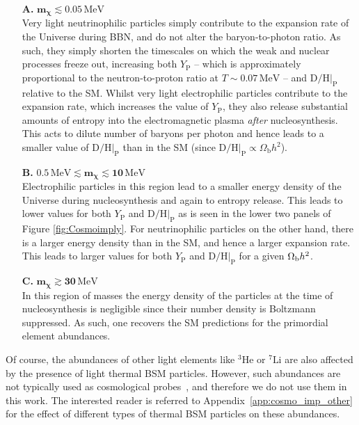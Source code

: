 \begin{enumerate}[leftmargin=0.7cm,itemsep=20pt]
    \item[\textbf{A.}] $\boldsymbol{m_\chi \lesssim 0.05 \, \mathrm{MeV}}$ \\ Very light neutrinophilic particles simply contribute to the expansion rate of the Universe during BBN, and do not alter the baryon-to-photon ratio. As such, they simply shorten the timescales on which the weak and nuclear processes freeze out, increasing both $Y_{\mathrm{P}}$ -- which is approximately proportional to the neutron-to-proton ratio at $T \sim 0.07 \, \mathrm{MeV}$ \cite{Sarkar:1995dd,Iocco:2008va,Pospelov:2010hj} -- and $\mathrm{D}/\mathrm{H}|_{\mathrm{P}}$ relative to the SM. Whilst very light electrophilic particles contribute to the expansion rate, which increases the value of $Y_{\mathrm{P}}$, they also release substantial amounts of entropy into the electromagnetic plasma \emph{after} nucleosynthesis. This acts to dilute number of baryons per photon and hence leads to a smaller value of $\mathrm{D}/\mathrm{H}|_{\mathrm{P}}$ than in the SM (since $\mathrm{D}/\mathrm{H}|_{\mathrm{P}} \propto \Omega_{\mathrm{b}}h^2$).
    
    \item[\textbf{B.}] $\boldsymbol{0.5 \, \mathrm{MeV} \lesssim m_\chi \lesssim 10 \, \mathrm{MeV}}$ \\ Electrophilic particles in this region lead to a smaller energy density of the Universe during nucleosynthesis and again to entropy release. This leads to lower values for both $Y_{\mathrm{P}}$ and $\mathrm{D}/\mathrm{H}|_{\mathrm{P}}$ as is seen in the lower two panels of Figure \ref{fig:Cosmoimply}. For neutrinophilic particles on the other hand, there is a larger energy density than in the SM, and hence a larger expansion rate. This leads to larger values for both $Y_{\mathrm{P}}$ and $\mathrm{D}/\mathrm{H}|_{\mathrm{P}}$ for a given $\Omega_{\rm b} h^2$.
    
    \item[\textbf{C.}] $\boldsymbol{m_\chi \gtrsim 30 \, \mathrm{MeV}}$ \\ In this region of masses the energy density of the particles at the time of nucleosynthesis is negligible since their number density is Boltzmann suppressed. As such, one recovers the SM predictions for the primordial element abundances.
\end{enumerate}

\noindent Of course, the abundances of other light elements like ${}^3\text{He}$ or ${}^{7}\text{Li}$ are also affected by the presence of light thermal BSM particles. However, such abundances are not typically used as cosmological probes~\cite{pdg}, and therefore we do not use them in this work. The interested reader is referred to Appendix~\ref{app:cosmo_imp_other} for the effect of different types of thermal BSM particles on these abundances. 

